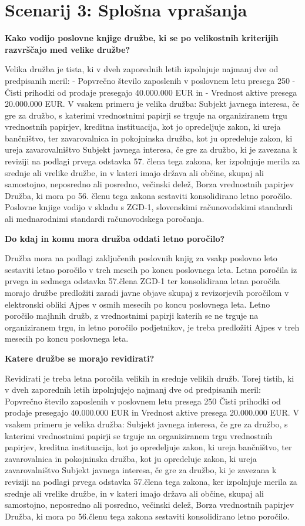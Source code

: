 \documentclass[a4paper,12pt,openright]{book}
\begin{document}
\section*{Scenarij 3: Splošna vprašanja}

\textbf{Kako vodijo poslovne knjige družbe, ki se po velikostnih kriterijih razvrščajo med velike družbe?}

Velika družba je tista, ki v dveh zaporednih letih izpolnjuje najmanj dve od predpisanih meril:
- Popvrečno število zaposlenih v poslovnem letu presega 250
- Čisti prihodki od prodaje presegajo 40.000.000 EUR in
- Vrednost aktive presega 20.000.000 EUR.
V vsakem primeru je velika družba:
Subjekt javnega interesa, če gre za družbo, s katerimi vrednostnimi papirji se trguje na organiziranem trgu vrednostnih papirjev, kreditna instituacija, kot jo opredeljuje zakon, ki ureja bančništvo, ter zavarovalnica in pokojninska družba, kot ju opredeluje zakon, ki ureja zavarovalništvo
Subjekt javnega interesa, če gre za družbo, ki je zavezana k reviziji na podlagi prvega odstavka 57. člena tega zakona, ker izpolnjuje merila za srednje ali vrelike družbe, in v kateri imajo država ali občine, skupaj ali samostojno, neposredno ali posredno, večinski delež,
Borza vrednostnih papirjev
Družba, ki mora po 56. členu tega zakona sestaviti konsolidirano letno poročilo.
Poslovne knjige vodijo v skladu s ZGD-1, slovenskimi računovodskimi standardi ali mednarodnimi standardi računovodskega poročanja.

\textbf{Do kdaj in komu mora družba oddati letno poročilo?}

Družba mora na podlagi zaključenih poslovnih knjig za vsakp poslovno leto sestaviti letno poročilo v treh meseih po koncu poslovnega leta. Letna poročila iz prvega in sedmega odstavka 57.člena ZGD-1 ter konsolidirana letna poročila morajo družbe predložiti  zaradi javne objave skupaj z revizorjevih poročilom v elektronski obliki Ajpes v osmih mesecih po koncu poslovnega leta. Letno poročilo majhnih družb, z vrednostnimi papirji katerih se ne trguje na organiziranem trgu, in letno poročilo podjetnikov, je treba predložiti Ajpes v treh mesecih po koncu poslovnega leta.

\textbf{Katere družbe se morajo revidirati?}

Revidirati je treba letna poročila velikih in srednje velikih družb. Torej tistih, ki v dveh zaporednih letih izpolnjujejo najmanj dve od predpisanih meril:
Popvrečno število zaposlenih v poslovnem letu presega 250
Čisti prihodki od prodaje presegajo 40.000.000 EUR in
Vrednost aktive presega 20.000.000 EUR.
V vsakem primeru je velika družba:
Subjekt javnega interesa, če gre za družbo, s katerimi vrednostnimi papirji se trguje na organiziranem trgu vrednostnih papirjev, kreditna instituacija, kot jo opredeljuje zakon, ki ureja bančništvo, ter zavarovalnica in pokojninska družba, kot ju opredeluje zakon, ki ureja zavarovalništvo
Subjekt javnega interesa, če gre za družbo, ki je zavezana k reviziji na podlagi prvega odstavka 57.člena tega zakona, ker izpolnjuje merila za srednje ali vrelike družbe, in v kateri imajo država ali občine, skupaj ali samostojno, neposredno ali posredno, večinski delež,
Borza vrednostnih papirjev
Družba, ki mora po 56.členu tega zakona sestaviti konsolidirano letno poročilo.
\end{document}
